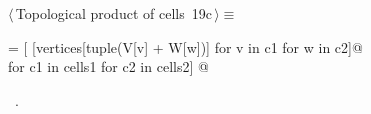 \documentclass[11pt,oneside]{article}	%
\begin{document}
\begin{flushleft} \small
\begin{minipage}{\linewidth} \label{scrap30}
\protect{}$\langle\,$Topological product of cells\nobreak\ {\footnotesize 19c}$\,\rangle\equiv$
\vspace{-1ex}
\begin{list}{}{} \item
\mbox{}\verb@cells = [ [vertices[tuple(V[v] + W[w])] for v in c1 for w in c2]@\\
\mbox{}\verb@         for c1 in cells1 for c2 in cells2]  @{\NWsep}
\end{list}
\vspace{-1ex}
\footnotesize\addtolength{\baselineskip}{-1ex}
\begin{list}{}{\setlength{\itemsep}{-\parsep}\setlength{\itemindent}{-\leftmargin}}
\item \NWtxtMacroRefIn\ .
\end{list}
\end{minipage}\\[4ex]
\end{flushleft}
\end{document}
